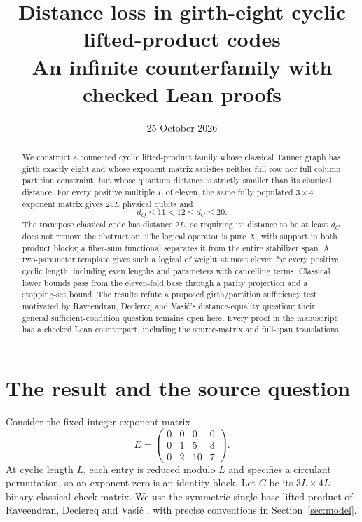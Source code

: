 \documentclass[11pt]{article}
\title{Distance loss in girth-eight cyclic lifted-product codes\\
An infinite counterfamily with checked Lean proofs}
\author{}
\date{25 October 2026}
\theoremstyle{definition}\newtheorem{definition}[theorem]{Definition}
\begin{document}
\maketitle
\begin{abstract}
We construct a connected cyclic lifted-product family whose classical Tanner
graph has girth exactly eight and whose exponent matrix satisfies neither
full row nor full column partition constraint, but whose quantum distance
is strictly smaller than its classical distance. For every positive multiple
$L$ of eleven, the same fully populated $3\times4$ exponent matrix gives
$25L$ physical qubits and
\[
 d_Q\leq 11<12\leq d_C\leq20.
\]
The transpose classical code has distance $2L$, so requiring its distance
to be at least $d_C$ does not remove the obstruction. The logical operator
is pure $X$, with support in both product blocks; a fiber-sum functional
separates it from the entire stabilizer span. A two-parameter template
gives such a logical of weight at most eleven for every positive cyclic
length, including even lengths and parameters with cancelling terms.
Classical lower bounds pass from the eleven-fold base through a parity
projection and a stopping-set bound. The results refute a proposed
girth/partition sufficiency test motivated by Raveendran, Declercq and
Vasi\'c's distance-equality question; their general sufficient-condition
question remains open here. Every proof in the manuscript has a checked
Lean counterpart, including the source-matrix and full-span translations.
\end{abstract}

\section{The result and the source question}\label{sec:answer}

Consider the fixed integer exponent matrix
\begin{equation}\label{eq:E}
 E=\begin{pmatrix}0&0&0&0\\0&1&5&3\\0&2&10&7\end{pmatrix}.
\end{equation}
At cyclic length $L$, each entry is reduced modulo $L$ and specifies a
circulant permutation, so an exponent zero is an identity block. Let $C$
be its $3L\times4L$ binary classical check matrix. We use the symmetric
single-base lifted product of Raveendran, Declercq and Vasi\'c
\cite[Eq.~(9)]{RDV}, with precise conventions in Section~\ref{sec:model}.
\end{document}
